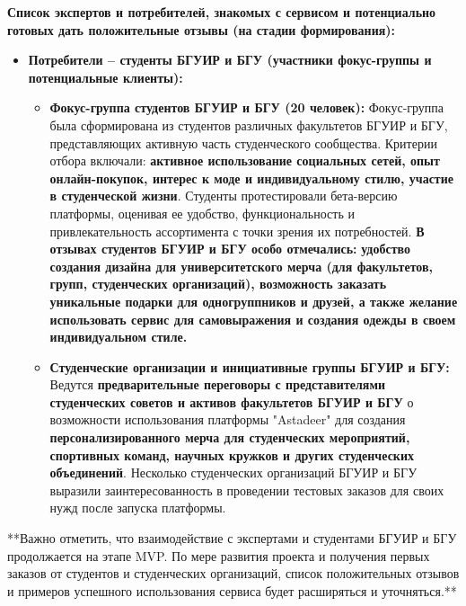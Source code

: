 \vspace{0.3cm}

\textbf{Список экспертов и потребителей, знакомых с сервисом и потенциально готовых дать положительные отзывы (на стадии формирования):}

\begin{itemize}
    \item \textbf{Потребители – студенты БГУИР и БГУ (участники фокус-группы и потенциальные клиенты):}
        \begin{itemize}
            \item \textbf{Фокус-группа студентов БГУИР и БГУ (20 человек):}  Фокус-группа была сформирована из студентов различных факультетов БГУИР и БГУ, представляющих активную часть студенческого сообщества.  Критерии отбора включали: \textbf{активное использование социальных сетей, опыт онлайн-покупок, интерес к моде и индивидуальному стилю, участие в студенческой жизни}.  Студенты протестировали бета-версию платформы, оценивая ее удобство, функциональность и привлекательность ассортимента с точки зрения их потребностей. \textbf{В отзывах студентов БГУИР и БГУ особо отмечались:}  \textbf{удобство создания дизайна для университетского мерча (для факультетов, групп, студенческих организаций), возможность заказать уникальные подарки для одногруппников и друзей, а также желание использовать сервис для самовыражения и создания одежды в своем индивидуальном стиле.}
            \item \textbf{Студенческие организации и инициативные группы БГУИР и БГУ:}  Ведутся \textbf{предварительные переговоры с представителями студенческих советов и активов факультетов БГУИР и БГУ}  о возможности использования платформы "Astadeer" для создания \textbf{персонализированного мерча для студенческих мероприятий, спортивных команд, научных кружков и других студенческих объединений}.  Несколько студенческих организаций БГУИР и БГУ выразили заинтересованность в проведении тестовых заказов для своих нужд после запуска платформы.
        \end{itemize}
\end{itemize}

\vspace{0.3cm}

**Важно отметить, что взаимодействие с экспертами и студентами БГУИР и БГУ продолжается на этапе MVP.  По мере развития проекта и получения первых заказов от студентов и студенческих организаций, список положительных отзывов и примеров успешного использования сервиса будет расширяться и уточняться.**